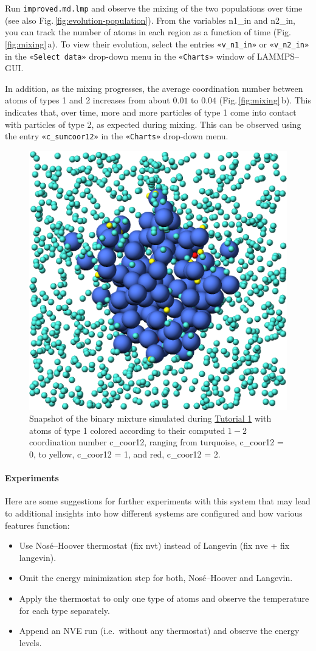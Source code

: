 \documentclass[9pt,tutorial]{livecoms}
\newcommand{\lmpcmd}[1]{\hspace{0pt}\colorbox{listing}{\textcolor{command}{\small{#1}}}\hspace{0pt}} %
\newcommand{\flecmd}[1]{\textcolor{command}{\texttt{#1}}} %
\newcommand{\guicmd}[1]{\textcolor{command}{\texttt{«#1»}}} %
\begin{document}
Run \flecmd{improved.md.lmp} and observe the mixing of the two populations
over time (see also Fig.\,\ref{fig:evolution-population}).  From the
variables \lmpcmd{n1\_in} and \lmpcmd{n2\_in}, you can track the number
of atoms in each region as a function of time
(Fig.\,\ref{fig:mixing}\,a).  To view their evolution, select the entries
\guicmd{v\_n1\_in} or \guicmd{v\_n2\_in} in the \guicmd{Select data} drop-down
menu in the \guicmd{Charts} window of LAMMPS--GUI.

In addition, as the mixing progresses, the average coordination number
between atoms of types 1 and 2 increases from about $0.01$ to $0.04$
(Fig.\,\ref{fig:mixing}\,b).  This indicates that, over time, more and
more particles of type 1 come into contact with particles of type 2, as
expected during mixing.  This can be observed using the entry
\guicmd{c\_sumcoor12} in the \guicmd{Charts} drop-down menu.

\begin{figure}
\centering
\includegraphics[width=0.55\linewidth]{LJ-coords}
\caption{Snapshot of the binary mixture simulated
  during \hyperref[lennard-jones-label]{Tutorial 1} with atoms of type 1
  colored according to their computed $1-2$ coordination
  number \lmpcmd{c\_coor12}, ranging from turquoise, \lmpcmd{c\_coor12 = 0},
  to yellow, \lmpcmd{c\_coor12 = 1}, and red, \lmpcmd{c\_coor12 = 2}.}
\label{fig:coords-viz}
\end{figure}

\paragraph{Experiments}

Here are some suggestions for further experiments with this system that
may lead to additional insights into how different systems are configured
and how various features function:
\begin{itemize}
\item Use Nos\'e--Hoover thermostat (\lmpcmd{fix nvt}) instead of Langevin
  (\lmpcmd{fix nve} + \lmpcmd{fix langevin}).
\item Omit the energy minimization step for both, Nos\'e--Hoover and Langevin.
\item Apply the thermostat to only one type of atoms and observe the
  temperature for each type separately.
\item Append an NVE run (i.e.~without any thermostat) and observe the energy levels.
\end{itemize}
\end{document}
